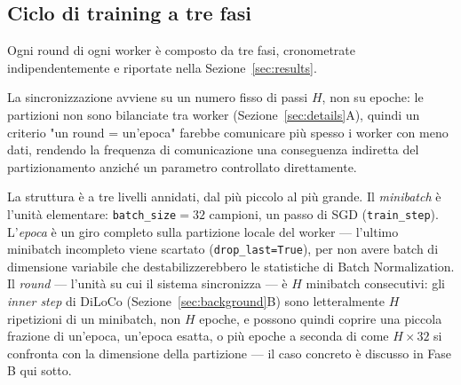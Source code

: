 \subsection{Ciclo di training a tre fasi}
Ogni round di ogni worker è composto da tre fasi, cronometrate
indipendentemente e riportate nella Sezione~\ref{sec:results}.

La sincronizzazione avviene su un numero fisso di passi $H$, non su epoche:
le partizioni non sono bilanciate tra worker (Sezione~\ref{sec:details}A),
quindi un criterio "un round = un'epoca" farebbe comunicare più spesso i
worker con meno dati, rendendo la frequenza di comunicazione una
conseguenza indiretta del partizionamento anziché un parametro controllato
direttamente.

La struttura è a tre livelli annidati, dal più piccolo al più grande. Il
\emph{minibatch} è l'unità elementare: \texttt{batch\_size}$=32$ campioni,
un passo di SGD (\texttt{train\_step}). L'\emph{epoca} è un giro completo
sulla partizione locale del worker — l'ultimo minibatch incompleto viene
scartato (\texttt{drop\_last=True}), per non avere batch di dimensione
variabile che destabilizzerebbero le statistiche di Batch Normalization. Il
\emph{round} — l'unità su cui il sistema sincronizza — è $H$ minibatch
consecutivi: gli \emph{inner step} di DiLoCo (Sezione~\ref{sec:background}B)
sono letteralmente $H$ ripetizioni di un minibatch, non $H$ epoche, e
possono quindi coprire una piccola frazione di un'epoca, un'epoca esatta, o
più epoche a seconda di come $H\times32$ si confronta con la dimensione
della partizione — il caso concreto è discusso in Fase B qui sotto.

